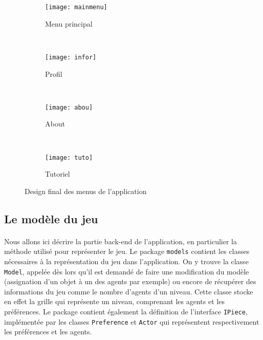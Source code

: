 \documentclass[../main.tex]{subfiles}
\begin{document}
\begin{figure}[ht!]
    \centering
    \begin{subfigure}{0.34\textwidth}
        \centering
        \texttt{[image: mainmenu]}
        \caption{Menu principal}
    \end{subfigure}
    ~
    \begin{subfigure}{0.34\textwidth}
        \centering
        \texttt{[image: infor]}
        \caption{Profil}
    \end{subfigure}
    ~
    \begin{subfigure}{0.34\textwidth}
        \centering
        \texttt{[image: abou]}
        \caption{About}
    \end{subfigure}
    ~
    \begin{subfigure}{0.34\textwidth}
        \centering
        \texttt{[image: tuto]}
        \caption{Tutoriel}
    \end{subfigure}
    \caption{Design final des menus de l'application}
    \label{fig-screen1}
\end{figure}
 
	\subsection{Le modèle du jeu}

\paragraph{}
Nous allons ici décrire la partie back-end de l'application, en particulier la méthode utilisé pour représenter le jeu. Le package \texttt{models} contient les classes nécessaires à la représentation du jeu dans l'application. On y trouve la classe \texttt{Model}, appelée dès lors qu'il est demandé de faire une modification du modèle (assignation d'un objet à un des agents par exemple) ou encore de récupérer des informations du jeu comme le nombre d'agents d'un niveau. Cette classe stocke en effet la grille qui représente un niveau, comprenant les agents et les préférences. Le package contient également la définition de l'interface \texttt{IPiece}, implémentée par les classes \texttt{Preference} et \texttt{Actor} qui représentent respectivement les préférences et les agents.
\end{document}
